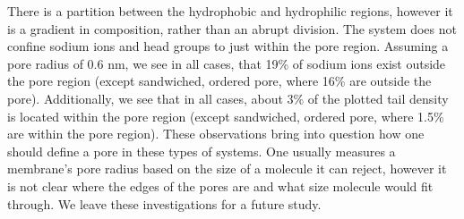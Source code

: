 \documentclass{article}
\begin{document}
  There is a partition between the hydrophobic and hydrophilic regions, however
  it is a gradient in composition, rather than an abrupt division. The system
  does not confine sodium ions and head groups to just within the pore region.
  Assuming a pore radius of 0.6 nm, we see in all cases, that 19\% of sodium ions
  exist outside the pore region (except sandwiched, ordered pore, where 16\%
  are outside the pore). Additionally, we see that in all cases, about 3\% of the
  plotted tail density is located within the pore region (except sandwiched,
  ordered pore, where 1.5\% are within the pore region). These observations bring
  into question how one should define a pore in these types of systems. One
  usually measures a membrane's pore radius based on the size of a molecule it
  can reject, however it is not clear where the edges of the pores are and what
  size molecule would fit through. We leave these investigations for a future
  study.
\end{document}
